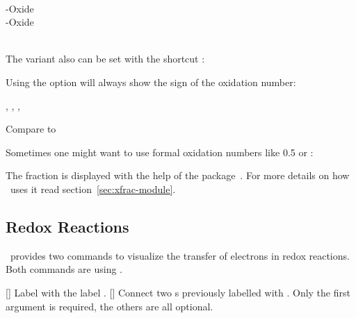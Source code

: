 \documentclass{chemmacros-manual}
\begin{document}
\begin{example}
    \\
  -Oxide \\
  -Oxide \\
   \\
\end{example}

The  variant also can be set with the shortcut \sarg:
\begin{example}
   
\end{example}

Using the  option will always show the sign of the
oxidation number:
\begin{example}
  , , , 
\end{example}

\begin{example}
  Compare  to 
\end{example}

Sometimes one might want to use formal oxidation numbers like \num{.5} or
:
\begin{example}

\end{example}

The fraction is displayed with the help of the 
package~\cite{bnd:l3packages}.  For more details on how \chemmacros\ uses it
read section~\vref{sec:xfrac-module}.

\subsection{Redox Reactions}\label{sec:redox-reactions}

\chemmacros\ provides two commands to visualize the transfer of electrons in
redox reactions.  Both commands are using \TikZ.
\begin{commands}
  []
    Label  with the label .
  []
    Connect two s previously labelled with .  Only the first
    argument  is required, the others are all
    optional.
\end{commands}
\end{document}
